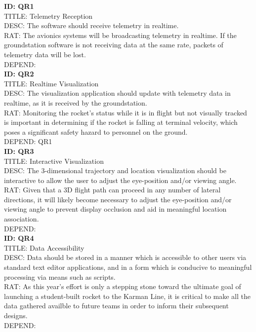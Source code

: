 \documentclass[onecolumn, draftclsnofoot,10pt, compsoc]{IEEEtran}
\begin{document}
			\noindent
			\textbf{ID: QR1}\\
			TITLE: Telemetry Reception\\
			DESC: The software should receive telemetry in realtime.\\
			RAT: The avionics systems will be broadcasting telemetry in realtime. 
				If the groundstation software is not receiving data at the same rate, packets of telemetry data will be lost.\\
			DEPEND: \\
			
			\noindent
			\textbf{ID: QR2}\\
			TITLE: Realtime Visualization\\
			DESC: The visualization application should update with telemetry data in realtime, as it is received by the groundstation.\\
			RAT: Monitoring the rocket's status while it is in flight but not visually tracked is important in determining if the rocket is falling at terminal velocity, which poses a significant safety hazard to personnel on the ground. \\
			DEPEND: QR1\\
			
			\noindent
			\textbf{ID: QR3}\\
			TITLE: Interactive Visualization\\
			DESC: The 3-dimensional trajectory and location visualization should be interactive to allow the user to adjust the eye-position and/or viewing angle.\\
			RAT: Given that a 3D flight path can proceed in any number of lateral directions, it will likely become necessary to adjust the eye-position and/or viewing angle to prevent display occlusion and aid in meaningful location association.\\
			DEPEND: \\
			
			\noindent
			\textbf{ID: QR4}\\
			TITLE: Data Accessibility\\
			DESC: Data should be stored in a manner which is accessible to other users via standard text editor applications, and in a form which is conducive to meaningful processing via means such as scripts.\\
			RAT: As this year's effort is only a stepping stone toward the ultimate goal of launching a student-built rocket to the Karman Line, it is critical to make all the data gathered availble to future teams in order to inform their subsequent designs.\\
			DEPEND: \\

\end{document}
